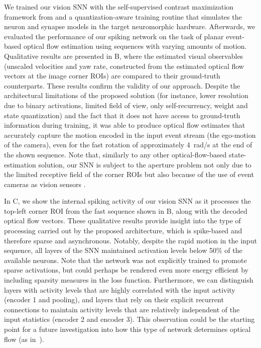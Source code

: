 We trained our vision SNN with the self-supervised contrast maximization framework from \cite{hagenaars2021selfsupervised} and a quantization-aware training routine that simulates the neuron and synapse models in the target neuromorphic hardware. Afterwards, we evaluated the performance of our spiking network on the task of planar event-based optical flow estimation using sequences with varying amounts of motion. Qualitative results are presented in B, where the estimated visual observables (unscaled velocities and yaw rate, constructed from the estimated optical flow vectors at the image corner ROIs) are compared to their ground-truth counterparts. These results confirm the validity of our approach. Despite the architectural limitations of the proposed solution (for instance, lower resolution due to binary activations, limited field of view, only self-recurrency, weight and state quantization) and the fact that it does not have access to ground-truth information during training, it was able to produce optical flow estimates that accurately capture the motion encoded in the input event stream (the ego-motion of the camera), even for the fast rotation of approximately 4~rad/s at the end of the shown sequence. Note that, similarly to any other optical-flow-based state-estimation solution, our SNN is subject to the aperture problem not only due to the limited receptive field of the corner ROIs but also because of the use of event cameras as vision sensors \cite{gallego2020eventbased}.

In C, we show the internal spiking activity of our vision SNN as it processes the top-left corner ROI from the fast sequence shown in B, along with the decoded optical flow vectors. These qualitative results provide insight into the type of processing carried out by the proposed architecture, which is spike-based and therefore sparse and asynchronous. Notably, despite the rapid motion in the input sequence, all layers of the SNN maintained activation levels below 50\% of the available neurons. Note that the network was not explicitly trained to promote sparse activations, but could perhaps be rendered even more energy efficient by including sparsity measures in the loss function. Furthermore, we can distinguish layers with activity levels that are highly correlated with the input activity (encoder 1 and pooling), and layers that rely on their explicit recurrent connections to maintain activity levels that are relatively independent of the input statistics (encoder 2 and encoder 3). This observation could be the starting point for a future investigation into how this type of network determines optical flow (as in~\cite{dejong2021how}).

